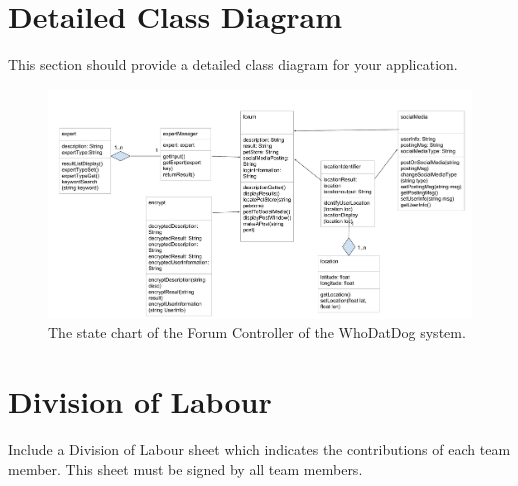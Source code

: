 \documentclass[]{article}
\begin{document}
\section{Detailed Class Diagram}
\label{sec:detailed_class_diagram}
This section should provide a detailed class diagram for your application.
\begin{figure}[H]
 \centering
 \includegraphics[width=\textwidth]{SE 3A04 D3 detailed class diagram.pdf}
 \caption{\label{fig:detailedclassdiagram}The state chart of the Forum Controller of the WhoDatDog system.}
\end{figure}

\appendix
\section{Division of Labour}
\label{sec:division_of_labour}
Include a Division of Labour sheet which indicates the contributions of each team member. This sheet must be signed by all team members.

\newpage
\end{document}
